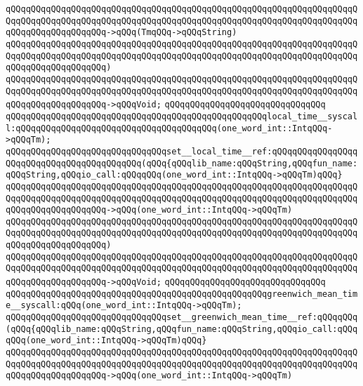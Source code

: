 \verb|qQQqqQQqqQQqqQQqqQQqqQQqqQQqqQQqqQQqqQQqqQQqqQQqqQQqqQQqqQQqqQQqqQQqqQQqqQQqqQQqqQQqqQQqqQQqqQQqqQQqqQQqqQQqqQQqqQQqqQQqqQQqqQQqqQQqqQQqqQQqqQQqqQQqqQQqqQQqqQQq->qQQq(TmqQQq->qQQqString)|\newline
\verb|qQQqqQQqqQQqqQQqqQQqqQQqqQQqqQQqqQQqqQQqqQQqqQQqqQQqqQQqqQQqqQQqqQQqqQQqqQQqqQQqqQQqqQQqqQQqqQQqqQQqqQQqqQQqqQQqqQQqqQQqqQQqqQQqqQQqqQQqqQQqqQQqqQQqqQQqqQQqqQQq)|\newline
\verb|qQQqqQQqqQQqqQQqqQQqqQQqqQQqqQQqqQQqqQQqqQQqqQQqqQQqqQQqqQQqqQQqqQQqqQQqqQQqqQQqqQQqqQQqqQQqqQQqqQQqqQQqqQQqqQQqqQQqqQQqqQQqqQQqqQQqqQQqqQQqqQQqqQQqqQQqqQQqqQQq->qQQqVoid;|\newline
\verb|qQQqqQQqqQQqqQQqqQQqqQQqqQQqqQQq|\newline
\verb|qQQqqQQqqQQqqQQqqQQqqQQqqQQqqQQqqQQqqQQqqQQqqQQqqQQqlocal_time__syscall:qQQqqQQqqQQqqQQqqQQqqQQqqQQqqQQqqQQqqQQq(one_word_int::IntqQQq->qQQqTm);|\newline
\verb|qQQqqQQqqQQqqQQqqQQqqQQqqQQqqQQqset__local_time__ref:qQQqqQQqqQQqqQQqqQQqqQQqqQQqqQQqqQQqqQQqqQQq(qQQq{qQQqlib_name:qQQqString,qQQqfun_name:qQQqString,qQQqio_call:qQQqqQQq(one_word_int::IntqQQq->qQQqTm)qQQq}|\newline
\verb|qQQqqQQqqQQqqQQqqQQqqQQqqQQqqQQqqQQqqQQqqQQqqQQqqQQqqQQqqQQqqQQqqQQqqQQqqQQqqQQqqQQqqQQqqQQqqQQqqQQqqQQqqQQqqQQqqQQqqQQqqQQqqQQqqQQqqQQqqQQqqQQqqQQqqQQqqQQqqQQq->qQQq(one_word_int::IntqQQq->qQQqTm)|\newline
\verb|qQQqqQQqqQQqqQQqqQQqqQQqqQQqqQQqqQQqqQQqqQQqqQQqqQQqqQQqqQQqqQQqqQQqqQQqqQQqqQQqqQQqqQQqqQQqqQQqqQQqqQQqqQQqqQQqqQQqqQQqqQQqqQQqqQQqqQQqqQQqqQQqqQQqqQQqqQQqqQQq)|\newline
\verb|qQQqqQQqqQQqqQQqqQQqqQQqqQQqqQQqqQQqqQQqqQQqqQQqqQQqqQQqqQQqqQQqqQQqqQQqqQQqqQQqqQQqqQQqqQQqqQQqqQQqqQQqqQQqqQQqqQQqqQQqqQQqqQQqqQQqqQQqqQQqqQQqqQQqqQQqqQQqqQQq->qQQqVoid;|\newline
\verb|qQQqqQQqqQQqqQQqqQQqqQQqqQQqqQQq|\newline
\verb|qQQqqQQqqQQqqQQqqQQqqQQqqQQqqQQqqQQqqQQqqQQqqQQqqQQqgreenwich_mean_time__syscall:qQQq(one_word_int::IntqQQq->qQQqTm);|\newline
\verb|qQQqqQQqqQQqqQQqqQQqqQQqqQQqqQQqset__greenwich_mean_time__ref:qQQqqQQq(qQQq{qQQqlib_name:qQQqString,qQQqfun_name:qQQqString,qQQqio_call:qQQqqQQq(one_word_int::IntqQQq->qQQqTm)qQQq}|\newline
\verb|qQQqqQQqqQQqqQQqqQQqqQQqqQQqqQQqqQQqqQQqqQQqqQQqqQQqqQQqqQQqqQQqqQQqqQQqqQQqqQQqqQQqqQQqqQQqqQQqqQQqqQQqqQQqqQQqqQQqqQQqqQQqqQQqqQQqqQQqqQQqqQQqqQQqqQQqqQQqqQQq->qQQq(one_word_int::IntqQQq->qQQqTm)|\newline
